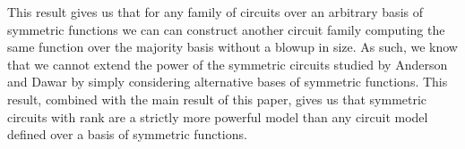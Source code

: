 \documentclass[../paper.tex]{subfiles}
\begin{document}
This result gives us that for any family of circuits over an arbitrary basis of
symmetric functions we can can construct another circuit family computing the
same function over the majority basis without a blowup in size. As such, we know
that we cannot extend the power of the symmetric circuits studied by Anderson
and Dawar \cite{AndersonD17} by simply considering alternative bases of
symmetric functions. This result, combined with the main result of this paper,
gives us that symmetric circuits with rank are a strictly more powerful model
than any circuit model defined over a basis of symmetric functions.
\end{document}
